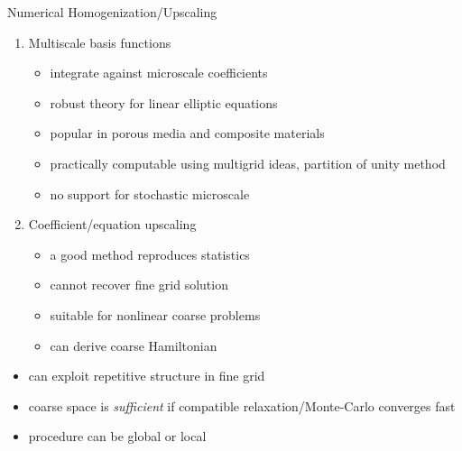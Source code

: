 \begin{frame}{Numerical Homogenization/Upscaling}
  \begin{enumerate}
  \item Multiscale basis functions
    \begin{itemize}
    \item integrate against microscale coefficients
    \item robust theory for linear elliptic equations
    \item popular in porous media and composite materials
    \item practically computable using multigrid ideas, partition of unity method
    \item no support for stochastic microscale
    \end{itemize}
  \item Coefficient/equation upscaling
    \begin{itemize}
    \item a good method reproduces statistics
    \item cannot recover fine grid solution
    \item suitable for nonlinear coarse problems
    \item can derive coarse Hamiltonian
    \end{itemize}
  \end{enumerate}
  \begin{itemize}
  \item can exploit repetitive structure in fine grid
  \item coarse space is \emph{sufficient} if compatible relaxation/Monte-Carlo converges fast
  \item procedure can be global or local
  \end{itemize}
\end{frame}
